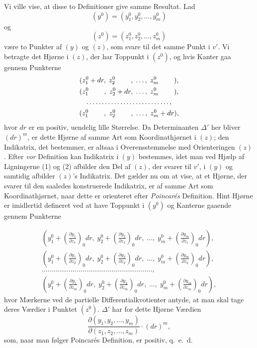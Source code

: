 \documentclass{article}
\begin{document}
Vi ville vise, at disse to Definitioner give samme Resultat. Lad
\[
(y^0) = (y_1^0, y_2^0, \dots, y_m^0)
\]
og
\[
(z^0) = (z_1^0, z_2^0, \dots, z_m^0)
\]
være to Punkter af $(y)$ og $(z)$, som svare til det samme Punkt i $v'$. Vi betragte det Hjørne i $(z)$, der har Toppunkt i $(z^0)$, og hvis Kanter gaa gennem Punkterne
\[
\begin{gathered}
(z_1^0 + dr, \; z_2^0 \hphantom{{} + dr}, \; \dots, \; z_m^0 \hphantom{{} + dr}), \\
(z_1^0 \hphantom{{} + dr}, \; z_2^0 + dr, \; \dots, \; z_m^0 \hphantom{{} + dr}), \\
\dots\dots\dots\dots\dots\dots\dots\dots\dots, \\
(z_1^0 \hphantom{{} + dr}, \; z_2^0 \hphantom{{} + dr}, \; \dots, \; z_m^0 + dr),
\end{gathered}
\]
hvor $dr$ er en positiv, uendelig lille Størrelse. Da Determinanten $\Delta'$ her bliver $(dr)^m$, er dette Hjørne af samme Art som Koordinathjørnet i $(z)$; den Indikatrix, det bestemmer, er altsaa i Overensstemmelse med Orienteringen $(z)$. Efter \emph{vor} Definition kan Indikatrix i $(y)$ bestemmes, idet man ved Hjælp af Ligningerne (1) og (2) afbilder den Del af $(z)$, der svarer til $v'$, i $(y)$ og samtidig afbilder $(z)$'s Indikatrix. Det gælder nu om at vise, at et Hjørne, der svarer til den saaledes konstruerede Indikatrix, er af samme Art som Koordinathjørnet, naar dette er orienteret efter \emph{Poincarés} Definition. Hint Hjørne er imidlertid defineret ved at have Toppunkt i $(y^0)$ og Kanterne gaaende gennem Punkterne

\[
\begin{gathered}
\left(y_1^0 + \left(\frac{\partial y_1}{\partial z_1}\right)_0 dr, \; y_2^0 + \left(\frac{\partial y_2}{\partial z_1}\right)_0 dr, \; \dots, \; y_m^0 + \left(\frac{\partial y_m}{\partial z_1}\right)_0 dr\right), \\
\left(y_1^0 + \left(\frac{\partial y_1}{\partial z_2}\right)_0 dr, \; y_2^0 + \left(\frac{\partial y_2}{\partial z_2}\right)_0 dr, \; \dots, \; y_m^0 + \left(\frac{\partial y_m}{\partial z_2}\right)_0 dr\right), \\
\dots\dots\dots\dots\dots\dots\dots\dots\dots\dots\dots\dots\dots\dots\dots\dots\dots\dots\dots, \\
\left(y_1^0 + \left(\frac{\partial y_1}{\partial z_m}\right)_0 dr, \; y_2^0 + \left(\frac{\partial y_2}{\partial z_m}\right)_0 dr, \; \dots, \; y_m^0 + \left(\frac{\partial y_m}{\partial z_m}\right)_0 dr\right),
\end{gathered}
\]
hvor Mærkerne ved de partielle Differentialkvotienter antyde, at man skal tage deres Værdier i Punktet $(z^0)$. $\Delta'$ har for dette Hjørne Værdien
\[
\frac{\partial(y_1, y_2, \dots, y_m)}{\partial(z_1, z_2, \dots, z_m)} \cdot (dr)^m,
\]
som, naar man følger Poincarés Definition, er positiv, q.~e.~d.
\end{document}
